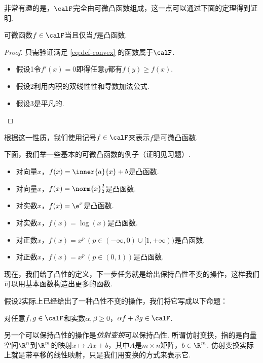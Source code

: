 非常有趣的是，$\calF$完全由可微凸函数组成，这一点可以通过下面的定理得到证明. 

\begin{theorem}\label{thm:differential-convex-equivalence}
    可微函数$f\in\calF$当且仅当$f$是凸函数.
\end{theorem}   
\begin{proof}
只需验证满足 \eqref{eq:def-convex} 的函数属于$\calF$.
    \begin{itemize}
        \item 假设1令$f'(x)=0$即得任意$y$都有$f(y)\geq f(x)$.
        \item 假设2利用内积的双线性性和导数加法公式.
        \item 假设3是平凡的.
    \end{itemize}
\end{proof}

根据这一性质，我们使用记号$f\in\calF$来表示$f$是可微凸函数.

下面，我们举一些基本的可微凸函数的例子（证明见习题）.

\begin{example}
    \begin{itemize}
        \item 对向量$x$，$f(x)=\inner{a}{x}+b$是凸函数.
        \item 对向量$x$，$f(x)=\norm{x}_2^2$是凸函数.
        \item 对实数$x$，$f(x)=\e^x$是凸函数.
        \item 对实数$x$，$f(x)=\log(x)$是凸函数.
        \item 对正数$x$，$f(x)=x^p\,(p\in(-\infty,0)\cup[1,+\infty))$是凸函数.
        \item 对正数$x$，$f(x)=x^p\,(p\in(0,1))$是凸函数.
    \end{itemize}
\end{example}

现在，我们给了凸性的定义，下一步任务就是给出保持凸性不变的操作，这样我们可以用基本函数构造出更多的函数. 

假设2实际上已经给出了一种凸性不变的操作，我们将它写成以下命题：
\begin{proposition}\label{prop:nonnegative-combination}
    对任意$f,g\in\calF$和实数$\alpha,\beta\geq 0$，$\alpha f+\beta g\in\calF$.
\end{proposition}

另一个可以保持凸性的操作是\emph{仿射变换}可以保持凸性. 所谓仿射变换，指的是向量空间$\R^n$到$\R^m$的映射$x\mapsto Ax+b$，其中$A$是$m\times n$矩阵，$b\in\R^m$. 仿射变换实际上就是带平移的线性映射，只是我们用变换的方式来表示它. 

